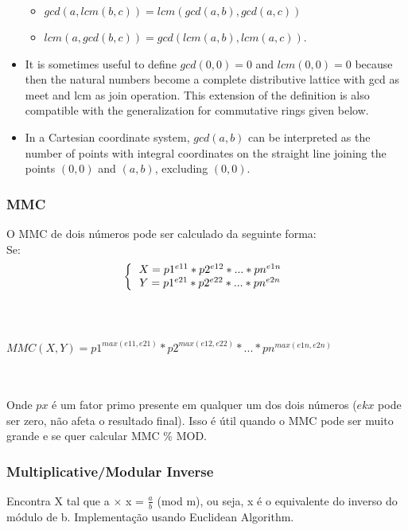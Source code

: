 \begin{itemize}
    \begin{itemize}
      \item $gcd(a, lcm(b, c)) = lcm(gcd(a, b), gcd(a, c))$
      \item $lcm(a, gcd(b, c)) = gcd(lcm(a, b), lcm(a, c))$.
    \end{itemize}
    \item It is sometimes useful to define $gcd(0, 0) = 0$ and $lcm(0, 0) = 0$ because then the natural numbers become a complete distributive lattice with gcd as meet and lcm as join operation. This extension of the definition is also compatible with the generalization for commutative rings given below.
    \item In a Cartesian coordinate system, $gcd(a, b)$ can be interpreted as the number of points with integral coordinates on the straight line joining the points $(0, 0)$ and $(a, b)$, excluding $(0, 0)$.
  \end{itemize}
\divisor


\subsubsection{MMC}
O MMC de dois n\'{u}meros pode ser calculado da seguinte forma:
\\ Se:
  \[
  \left \{
  \begin{tabular}{c}
    $X=p1^{e11}*p2^{e12}*...*pn^{e1n}$ \\
    $Y=p1^{e21}*p2^{e22}*...*pn^{e2n}$
   \end{tabular}
   \right.
   \]
\\ 
\\ \centerline{$MMC(X,Y)=p1^{max(e11,e21)}*p2^{max(e12,e22)}*...*pn^{max(e1n,e2n)}$}
\\
\\ Onde $px$ \'{e} um fator primo presente em qualquer um dos dois n\'{u}meros ($ekx$ pode ser zero, n\~{a}o afeta o resultado final). Isso \'{e} \'{u}til quando o MMC pode ser muito grande e se quer calcular MMC \% MOD.

\divisor

\subsubsection{Multiplicative/Modular Inverse}
Encontra X tal que a $\times$ x = $\frac{a}{b}$ (mod m), ou seja, x é o equivalente do inverso do módulo de b. Implementação usando Euclidean Algorithm.
\divisor

